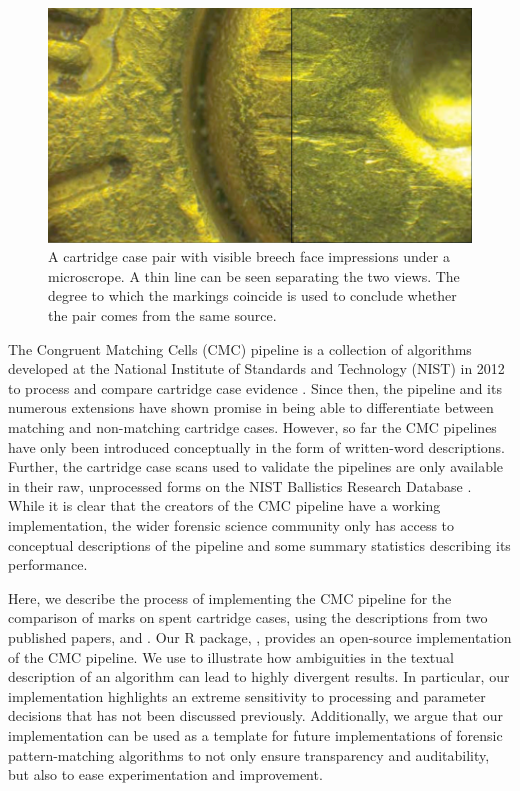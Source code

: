 \begin{Schunk}
\begin{figure}[htbp]
\includegraphics[width=\textwidth]{images/cartridgeCasePair_comparison_with_line} \caption{\label{fig:ccPair_combined} A cartridge case pair with visible breech face impressions under a microscrope.  A thin line can be seen separating the two views. The degree to which the markings coincide is used to conclude whether the pair comes from the same source.}\label{fig:unnamed-chunk-1}
\end{figure}
\end{Schunk}

The Congruent Matching Cells (CMC) pipeline is a collection of
algorithms developed at the National Institute of Standards and
Technology (NIST) in 2012 to process and compare cartridge case evidence
\citep{song_proposed_2013}. Since then, the pipeline and its numerous
extensions
\citep{tong_improved_2015,chen_convergence_2017,song_estimating_2018}
have shown promise in being able to differentiate between matching and
non-matching cartridge cases. However, so far the CMC pipelines have
only been introduced conceptually in the form of written-word
descriptions. Further, the cartridge case scans used to validate the
pipelines are only available in their raw, unprocessed forms on the NIST
Ballistics Research Database \citep{nbtrd}. While it is clear that the
creators of the CMC pipeline have a working implementation, the wider
forensic science community only has access to conceptual descriptions of
the pipeline and some summary statistics describing its performance.

Here, we describe the process of implementing the CMC pipeline for the
comparison of marks on spent cartridge cases, using the descriptions
from two published papers, \citet{song_3d_2014} and
\citet{tong_improved_2015}. Our R package, , provides an
open-source implementation of the CMC pipeline. We use  to
illustrate how ambiguities in the textual description of an algorithm
can lead to highly divergent results. In particular, our implementation
highlights an extreme sensitivity to processing and parameter decisions
that has not been discussed previously. Additionally, we argue that our
implementation can be used as a template for future implementations of
forensic pattern-matching algorithms to not only ensure transparency and
auditability, but also to ease experimentation and improvement.

